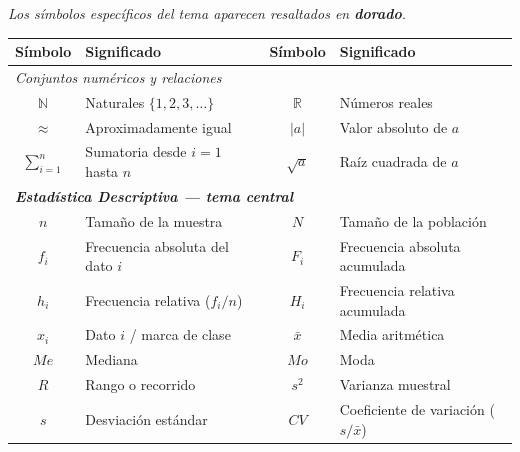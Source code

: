 \documentclass[11pt, letterpaper]{article}
\begin{document}
\begin{tcolorbox}[importantbox, title={Glosario de simbolog\'ia}]

{\small\textit{Los s\'imbolos espec\'ificos del tema aparecen resaltados en \textcolor{zenitgold}{\textbf{dorado}}.}}

\medskip
\begin{center}
\renewcommand{\arraystretch}{1.32}
\begin{tabular}{c p{4.5cm} | c p{4.5cm}}
\toprule
\textbf{S\'imbolo} & \textbf{Significado} & \textbf{S\'imbolo} & \textbf{Significado}\\
\midrule
\multicolumn{4}{l}{\textit{Conjuntos num\'ericos y relaciones}}\\
$\mathbb{N}$ & Naturales $\{1,2,3,\ldots\}$ &
$\mathbb{R}$ & N\'umeros reales\\
$\approx$ & Aproximadamente igual &
$|a|$ & Valor absoluto de $a$\\
$\sum_{i=1}^{n}$ & Sumatoria desde $i=1$ hasta $n$ &
$\sqrt{a}$ & Ra\'iz cuadrada de $a$\\[4pt]
\multicolumn{4}{l}{\textit{\textcolor{zenitgold}{\textbf{Estad\'istica Descriptiva --- tema central}}}}\\
\textcolor{zenitgold}{$n$} & \textcolor{zenitgold}{Tama\~no de la muestra} &
\textcolor{zenitgold}{$N$} & \textcolor{zenitgold}{Tama\~no de la poblaci\'on}\\
\textcolor{zenitgold}{$f_i$} & \textcolor{zenitgold}{Frecuencia absoluta del dato $i$} &
\textcolor{zenitgold}{$F_i$} & \textcolor{zenitgold}{Frecuencia absoluta acumulada}\\
\textcolor{zenitgold}{$h_i$} & \textcolor{zenitgold}{Frecuencia relativa ($f_i/n$)} &
\textcolor{zenitgold}{$H_i$} & \textcolor{zenitgold}{Frecuencia relativa acumulada}\\
\textcolor{zenitgold}{$x_i$} & \textcolor{zenitgold}{Dato $i$ / marca de clase} &
\textcolor{zenitgold}{$\bar{x}$} & \textcolor{zenitgold}{Media aritm\'etica}\\
\textcolor{zenitgold}{$Me$} & \textcolor{zenitgold}{Mediana} &
\textcolor{zenitgold}{$Mo$} & \textcolor{zenitgold}{Moda}\\
\textcolor{zenitgold}{$R$} & \textcolor{zenitgold}{Rango o recorrido} &
\textcolor{zenitgold}{$s^2$} & \textcolor{zenitgold}{Varianza muestral}\\
\textcolor{zenitgold}{$s$} & \textcolor{zenitgold}{Desviaci\'on est\'andar} &
\textcolor{zenitgold}{$CV$} & \textcolor{zenitgold}{Coeficiente de variaci\'on ($s/\bar{x}$)}\\

\end{tabular}
\end{center}
\end{tcolorbox}
\end{document}
